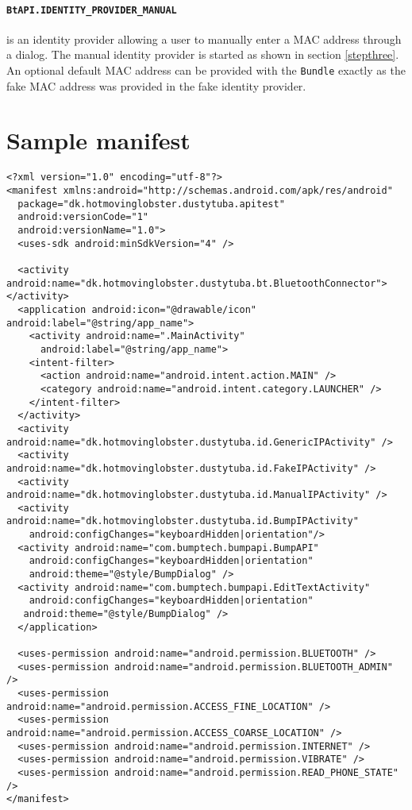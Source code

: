\documentclass[a4paper,11pt]{article}
\begin{document}
\paragraph{{\tt BtAPI.IDENTITY\_PROVIDER\_MANUAL}}
is an identity provider allowing a user to manually enter a MAC address through a dialog. The manual identity provider is started as shown in section \ref{stepthree}. An optional default MAC address can be provided with the \verb+Bundle+ exactly as the fake MAC address was provided in the fake identity provider.


\clearpage
\appendix

\section{Sample manifest}
\label{sample-manifest}

\footnotesize
\begin{verbatim}
<?xml version="1.0" encoding="utf-8"?>
<manifest xmlns:android="http://schemas.android.com/apk/res/android"
  package="dk.hotmovinglobster.dustytuba.apitest"
  android:versionCode="1"
  android:versionName="1.0">
  <uses-sdk android:minSdkVersion="4" />

  <activity android:name="dk.hotmovinglobster.dustytuba.bt.BluetoothConnector"></activity>
  <application android:icon="@drawable/icon" android:label="@string/app_name">
    <activity android:name=".MainActivity"
      android:label="@string/app_name">
    <intent-filter>
      <action android:name="android.intent.action.MAIN" />
      <category android:name="android.intent.category.LAUNCHER" />
    </intent-filter>
  </activity>
  <activity android:name="dk.hotmovinglobster.dustytuba.id.GenericIPActivity" />
  <activity android:name="dk.hotmovinglobster.dustytuba.id.FakeIPActivity" />
  <activity android:name="dk.hotmovinglobster.dustytuba.id.ManualIPActivity" />
  <activity android:name="dk.hotmovinglobster.dustytuba.id.BumpIPActivity"
    android:configChanges="keyboardHidden|orientation"/>
  <activity android:name="com.bumptech.bumpapi.BumpAPI"
    android:configChanges="keyboardHidden|orientation"
    android:theme="@style/BumpDialog" />
  <activity android:name="com.bumptech.bumpapi.EditTextActivity"
    android:configChanges="keyboardHidden|orientation"
   android:theme="@style/BumpDialog" />
  </application>
  
  <uses-permission android:name="android.permission.BLUETOOTH" />
  <uses-permission android:name="android.permission.BLUETOOTH_ADMIN" />  
  <uses-permission android:name="android.permission.ACCESS_FINE_LOCATION" />
  <uses-permission android:name="android.permission.ACCESS_COARSE_LOCATION" />
  <uses-permission android:name="android.permission.INTERNET" />
  <uses-permission android:name="android.permission.VIBRATE" />
  <uses-permission android:name="android.permission.READ_PHONE_STATE" />
</manifest>
\end{verbatim}
\normalsize
\end{document}
